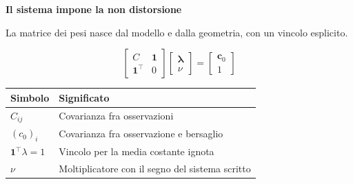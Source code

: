 \documentclass[12pt,aspectratio=1610]{beamer}
\begin{document}
\begin{frame}[plain]\hypertarget{slide101}{}
\begin{lrbox}{\TitleBox}
\begin{minipage}[t]{17.7cm}\raggedright\color{Ink}\fontsize{11.3}{14.8}\selectfont
\color{Navy}\bfseries\fontsize{20.6}{24.5}\selectfont Il sistema impone la non distorsione
\end{minipage}\end{lrbox}

\begin{lrbox}{\RecallBox}
\begin{minipage}[t]{14.3cm}\raggedright\color{Ink}\fontsize{11.3}{14.8}\selectfont
\fontsize{10.3}{13.8}\selectfont La matrice dei pesi nasce dal modello e dalla geometria, con un vincolo esplicito.
\end{minipage}\end{lrbox}

\begin{lrbox}{\PilotLeftBox}
\begin{minipage}[t]{10.05cm}\raggedright\color{Ink}\fontsize{11.3}{14.8}\selectfont
\[\begin{bmatrix}C&\mathbf1\\\mathbf1^\top&0\end{bmatrix}\begin{bmatrix}\boldsymbol\lambda\\ \nu\end{bmatrix}=\begin{bmatrix}\boldsymbol c_0\\1\end{bmatrix}\]
{\fontsize{10.2}{13.1}\selectfont\renewcommand{\arraystretch}{1.45}\begin{tabular}{@{}p{3.2cm}p{5.8cm}@{}}\toprule
\textbf{Simbolo} & \textbf{Significato}\\\midrule
$C_{ij}$ & Covarianza fra osservazioni\\
$(c_0)_i$ & Covarianza fra osservazione e bersaglio\\
$\mathbf1^\top\lambda=1$ & Vincolo per la media costante ignota\\
$\nu$ & Moltiplicatore con il segno del sistema scritto\\
\bottomrule\end{tabular}}


\end{minipage}
\end{lrbox}
\end{frame}
\end{document}
